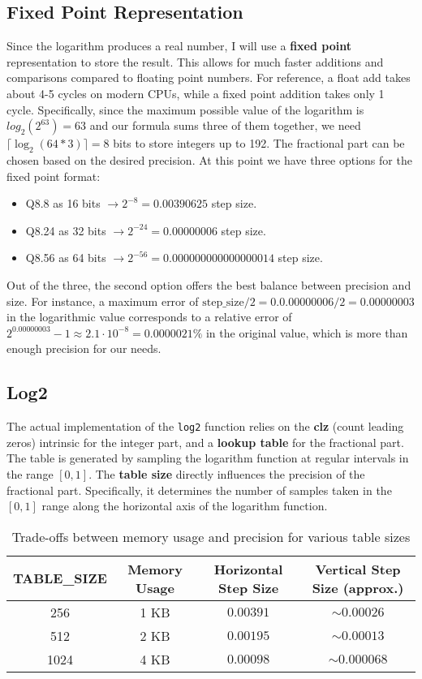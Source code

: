 \documentclass[11pt]{article}
\begin{document}
\subsection{Fixed Point Representation}
Since the logarithm produces a real number, I will use a \textbf{fixed point} representation to store the result. This allows for much faster additions and comparisons compared to floating point numbers. For reference, a float add takes about 4-5 cycles on modern CPUs\textsuperscript{\cite{agner2024}}, while a fixed point addition takes only 1 cycle. Specifically, since the maximum possible value of the logarithm is $log_2(2^{63}) = 63$ and our formula sums three of them together, we need $\lceil \log_2(64 * 3) \rceil = 8$ bits to store integers up to 192. The fractional part can be chosen based on the desired precision. At this point we have three options for the fixed point format:
\begin{itemize}
    \item Q8.8 as 16 bits $\rightarrow 2^{-8} = 0.00390625$ step size.
    \item Q8.24 as 32 bits $\rightarrow 2^{-24} = 0.00000006$ step size.
    \item Q8.56 as 64 bits $\rightarrow 2^{-56} = 0.000000000000000014$ step size.
\end{itemize}
Out of the three, the second option offers the best balance between precision and size. For instance, a maximum error of $\text{step\_size} / 2 = 0.0.00000006 / 2 = 0.00000003$ in the logarithmic value corresponds to a relative error of $2^{0.00000003} - 1 \approx 2.1 \cdot 10^{-8} = 0.0000021\%$ in the original value, which is more than enough precision for our needs.

\subsection{Log2}
The actual implementation of the \texttt{log2} function relies on the \textbf{clz} (count leading zeros) intrinsic for the integer part, and a \textbf{lookup table} for the fractional part. The table is generated by sampling the logarithm function at regular intervals in the range $[0, 1]$.
The \textbf{table size} directly influences the precision of the fractional part. Specifically, it determines the number of samples taken in the $[0, 1]$ range along the horizontal axis of the logarithm function.
\begin{table}[h]
\centering
\begin{tabular}{|c|c|c|c|}
\hline
\textbf{TABLE\_SIZE} & \textbf{Memory Usage} & \textbf{Horizontal Step Size} & \textbf{Vertical Step Size (approx.)} \\
\hline
256     & 1 KB    & $0.00391$   & $\sim0.00026$ \\
512     & 2 KB    & $0.00195$   & $\sim0.00013$ \\
1024    & 4 KB    & $0.00098$   & $\sim0.000068$ \\
\hline
\end{tabular}
\caption{Trade-offs between memory usage and precision for various table sizes}
\end{table}
\end{document}
